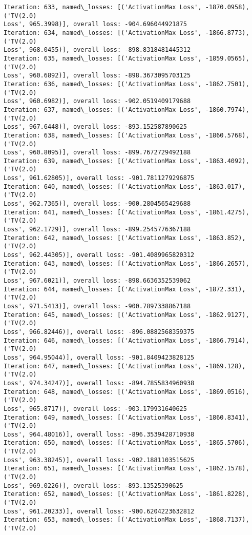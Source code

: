 \documentclass[10pt]{article}
\begin{document}
\begin{Verbatim}[commandchars=\\\{\}]
Iteration: 633, named\_losses: [('ActivationMax Loss', -1870.0958), ('TV(2.0)
Loss', 965.3998)], overall loss: -904.696044921875
Iteration: 634, named\_losses: [('ActivationMax Loss', -1866.8773), ('TV(2.0)
Loss', 968.0455)], overall loss: -898.8318481445312
Iteration: 635, named\_losses: [('ActivationMax Loss', -1859.0565), ('TV(2.0)
Loss', 960.6892)], overall loss: -898.3673095703125
Iteration: 636, named\_losses: [('ActivationMax Loss', -1862.7501), ('TV(2.0)
Loss', 960.6982)], overall loss: -902.0519409179688
Iteration: 637, named\_losses: [('ActivationMax Loss', -1860.7974), ('TV(2.0)
Loss', 967.6448)], overall loss: -893.152587890625
Iteration: 638, named\_losses: [('ActivationMax Loss', -1860.5768), ('TV(2.0)
Loss', 960.8095)], overall loss: -899.7672729492188
Iteration: 639, named\_losses: [('ActivationMax Loss', -1863.4092), ('TV(2.0)
Loss', 961.62805)], overall loss: -901.7811279296875
Iteration: 640, named\_losses: [('ActivationMax Loss', -1863.017), ('TV(2.0)
Loss', 962.7365)], overall loss: -900.2804565429688
Iteration: 641, named\_losses: [('ActivationMax Loss', -1861.4275), ('TV(2.0)
Loss', 962.1729)], overall loss: -899.2545776367188
Iteration: 642, named\_losses: [('ActivationMax Loss', -1863.852), ('TV(2.0)
Loss', 962.44305)], overall loss: -901.4089965820312
Iteration: 643, named\_losses: [('ActivationMax Loss', -1866.2657), ('TV(2.0)
Loss', 967.6021)], overall loss: -898.6636352539062
Iteration: 644, named\_losses: [('ActivationMax Loss', -1872.331), ('TV(2.0)
Loss', 971.5413)], overall loss: -900.7897338867188
Iteration: 645, named\_losses: [('ActivationMax Loss', -1862.9127), ('TV(2.0)
Loss', 966.82446)], overall loss: -896.0882568359375
Iteration: 646, named\_losses: [('ActivationMax Loss', -1866.7914), ('TV(2.0)
Loss', 964.95044)], overall loss: -901.8409423828125
Iteration: 647, named\_losses: [('ActivationMax Loss', -1869.128), ('TV(2.0)
Loss', 974.34247)], overall loss: -894.7855834960938
Iteration: 648, named\_losses: [('ActivationMax Loss', -1869.0516), ('TV(2.0)
Loss', 965.8717)], overall loss: -903.179931640625
Iteration: 649, named\_losses: [('ActivationMax Loss', -1860.8341), ('TV(2.0)
Loss', 964.48016)], overall loss: -896.3539428710938
Iteration: 650, named\_losses: [('ActivationMax Loss', -1865.5706), ('TV(2.0)
Loss', 963.38245)], overall loss: -902.1881103515625
Iteration: 651, named\_losses: [('ActivationMax Loss', -1862.1578), ('TV(2.0)
Loss', 969.0226)], overall loss: -893.13525390625
Iteration: 652, named\_losses: [('ActivationMax Loss', -1861.8228), ('TV(2.0)
Loss', 961.20233)], overall loss: -900.6204223632812
Iteration: 653, named\_losses: [('ActivationMax Loss', -1868.7137), ('TV(2.0)

\end{Verbatim}
\end{document}
